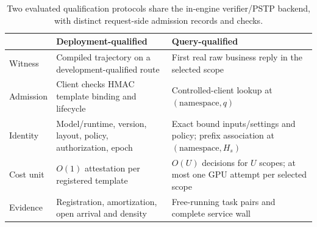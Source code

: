 \begin{table}[t]
\centering\footnotesize
\setlength{\tabcolsep}{3pt}
\caption{Two evaluated qualification protocols share the in-engine verifier/PSTP backend, with distinct request-side admission records and checks.}
\label{tab:qualification-protocols}
\begin{tabular}{@{}P{.58in}P{1.25in}P{1.32in}@{}}
\toprule
& Deployment-qualified & Query-qualified\\
\midrule
Witness & Compiled trajectory on a development-qualified route & First real raw business reply in the selected scope\\
Admission & Client checks HMAC template binding and lifecycle & Controlled-client lookup at $(\mathrm{namespace},q)$\\
Identity & Model/runtime, version, layout, policy, authorization, epoch & Exact bound inputs/settings and policy; prefix association at $(\mathrm{namespace},H_s)$\\
Cost unit & $O(1)$ attestation per registered template & $O(U)$ decisions for $U$ scopes; at most one GPU attempt per selected scope\\
Evidence & Registration, amortization, open arrival and density & Free-running task pairs and complete service wall\\
\bottomrule
\end{tabular}
\end{table}
